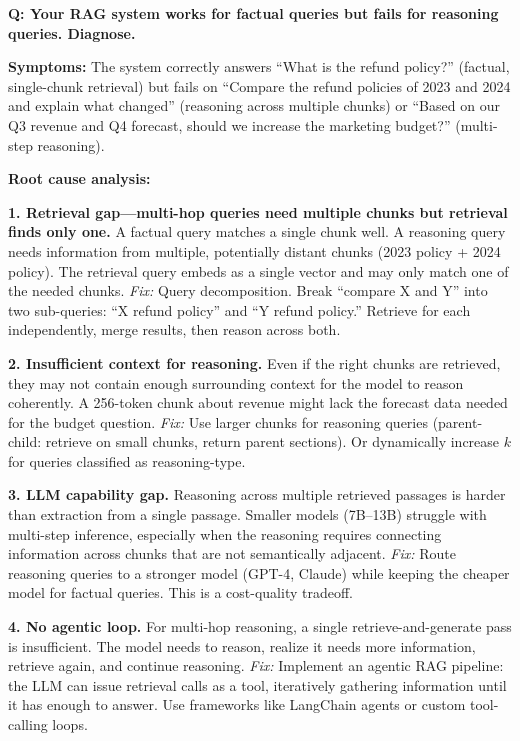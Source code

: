 \begin{interviewq}
\textbf{Q: Your RAG system works for factual queries but fails for reasoning queries. Diagnose.}

 \quad {} \quad \badgefreq{\freqlow}

\stronganswer

\textbf{Symptoms:} The system correctly answers ``What is the refund policy?'' (factual, single-chunk retrieval) but fails on ``Compare the refund policies of 2023 and 2024 and explain what changed'' (reasoning across multiple chunks) or ``Based on our Q3 revenue and Q4 forecast, should we increase the marketing budget?'' (multi-step reasoning).

\textbf{Root cause analysis:}

\textbf{1. Retrieval gap---multi-hop queries need multiple chunks but retrieval finds only one.} A factual query matches a single chunk well. A reasoning query needs information from multiple, potentially distant chunks (2023 policy + 2024 policy). The retrieval query embeds as a single vector and may only match one of the needed chunks.
\textit{Fix:} Query decomposition. Break ``compare X and Y'' into two sub-queries: ``X refund policy'' and ``Y refund policy.'' Retrieve for each independently, merge results, then reason across both.

\textbf{2. Insufficient context for reasoning.} Even if the right chunks are retrieved, they may not contain enough surrounding context for the model to reason coherently. A 256-token chunk about revenue might lack the forecast data needed for the budget question.
\textit{Fix:} Use larger chunks for reasoning queries (parent-child: retrieve on small chunks, return parent sections). Or dynamically increase $k$ for queries classified as reasoning-type.

\textbf{3. LLM capability gap.} Reasoning across multiple retrieved passages is harder than extraction from a single passage. Smaller models (7B--13B) struggle with multi-step inference, especially when the reasoning requires connecting information across chunks that are not semantically adjacent.
\textit{Fix:} Route reasoning queries to a stronger model (GPT-4, Claude) while keeping the cheaper model for factual queries. This is a cost-quality tradeoff.

\textbf{4. No agentic loop.} For multi-hop reasoning, a single retrieve-and-generate pass is insufficient. The model needs to reason, realize it needs more information, retrieve again, and continue reasoning.
\textit{Fix:} Implement an agentic RAG pipeline: the LLM can issue retrieval calls as a tool, iteratively gathering information until it has enough to answer. Use frameworks like LangChain agents or custom tool-calling loops.


\end{interviewq}
